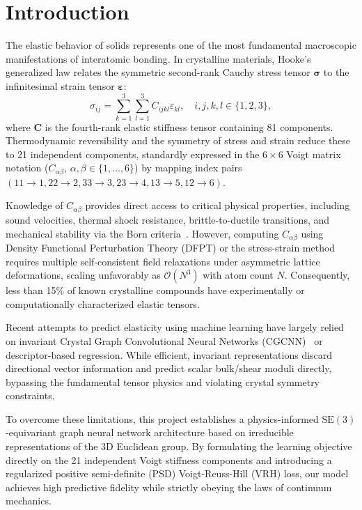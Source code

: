 \documentclass[twocolumn,10pt,aps,prb,superscriptaddress,floatfix]{revtex4-2}
\begin{document}
\maketitle

\section{Introduction}
\label{sec:intro}

The elastic behavior of solids represents one of the most fundamental macroscopic manifestations of interatomic bonding. In crystalline materials, Hooke's generalized law relates the symmetric second-rank Cauchy stress tensor $\bm{\sigma}$ to the infinitesimal strain tensor $\bm{\varepsilon}$:
\begin{equation}
\sigma_{ij} = \sum_{k=1}^3 \sum_{l=1}^3 C_{ijkl} \varepsilon_{kl}, \quad i,j,k,l \in \{1,2,3\},
\label{eq:hooke}
\end{equation}
where $\bm{C}$ is the fourth-rank elastic stiffness tensor containing 81 components. Thermodynamic reversibility and the symmetry of stress and strain reduce these to 21 independent components, standardly expressed in the $6 \times 6$ Voigt matrix notation ($C_{\alpha\beta}$, $\alpha,\beta \in \{1,\dots,6\}$) by mapping index pairs $(11 \rightarrow 1, 22 \rightarrow 2, 33 \rightarrow 3, 23 \rightarrow 4, 13 \rightarrow 5, 12 \rightarrow 6)$.

Knowledge of $C_{\alpha\beta}$ provides direct access to critical physical properties, including sound velocities, thermal shock resistance, brittle-to-ductile transitions, and mechanical stability via the Born criteria~\cite{mowbray2015}. However, computing $C_{\alpha\beta}$ using Density Functional Perturbation Theory (DFPT) or the stress-strain method requires multiple self-consistent field relaxations under asymmetric lattice deformations, scaling unfavorably as $\mathcal{O}(N^3)$ with atom count $N$. Consequently, less than 15\% of known crystalline compounds have experimentally or computationally characterized elastic tensors.

Recent attempts to predict elasticity using machine learning have largely relied on invariant Crystal Graph Convolutional Neural Networks (CGCNN)~\cite{xie2018crystal} or descriptor-based regression. While efficient, invariant representations discard directional vector information and predict scalar bulk/shear moduli directly, bypassing the fundamental tensor physics and violating crystal symmetry constraints. 

To overcome these limitations, this project establishes a physics-informed $\mathrm{SE}(3)$-equivariant graph neural network architecture based on irreducible representations of the 3D Euclidean group. By formulating the learning objective directly on the 21 independent Voigt stiffness components and introducing a regularized positive semi-definite (PSD) Voigt-Reuss-Hill (VRH) loss, our model achieves high predictive fidelity while strictly obeying the laws of continuum mechanics.
\end{document}
